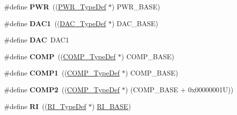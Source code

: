 \begin{DoxyCompactItemize}
\item 
\hypertarget{group___peripheral__declaration_ga04651c526497822a859942b928e57f8e}{\#define {\bfseries P\-W\-R}~((\hyperlink{struct_p_w_r___type_def}{P\-W\-R\-\_\-\-Type\-Def} $\ast$) P\-W\-R\-\_\-\-B\-A\-S\-E)}\label{group___peripheral__declaration_ga04651c526497822a859942b928e57f8e}

\item 
\hypertarget{group___peripheral__declaration_gaffb5ff8779fa698f3c7165a617d56e4f}{\#define {\bfseries D\-A\-C1}~((\hyperlink{struct_d_a_c___type_def}{D\-A\-C\-\_\-\-Type\-Def} $\ast$) D\-A\-C\-\_\-\-B\-A\-S\-E)}\label{group___peripheral__declaration_gaffb5ff8779fa698f3c7165a617d56e4f}

\item 
\hypertarget{group___peripheral__declaration_ga4aa2a4ab86ce00c23035e5cee2e7fc7e}{\#define {\bfseries D\-A\-C}~D\-A\-C1}\label{group___peripheral__declaration_ga4aa2a4ab86ce00c23035e5cee2e7fc7e}

\item 
\hypertarget{group___peripheral__declaration_ga076912543697dbe4c46b79e8e44ad2fb}{\#define {\bfseries C\-O\-M\-P}~((\hyperlink{struct_c_o_m_p___type_def}{C\-O\-M\-P\-\_\-\-Type\-Def} $\ast$) C\-O\-M\-P\-\_\-\-B\-A\-S\-E)}\label{group___peripheral__declaration_ga076912543697dbe4c46b79e8e44ad2fb}

\item 
\hypertarget{group___peripheral__declaration_gaf5713f83009027d48805b049d55bb01b}{\#define {\bfseries C\-O\-M\-P1}~((\hyperlink{struct_c_o_m_p___type_def}{C\-O\-M\-P\-\_\-\-Type\-Def} $\ast$) C\-O\-M\-P\-\_\-\-B\-A\-S\-E)}\label{group___peripheral__declaration_gaf5713f83009027d48805b049d55bb01b}

\item 
\hypertarget{group___peripheral__declaration_ga6985fa7e9bb3c2edf15b29b7af210a2b}{\#define {\bfseries C\-O\-M\-P2}~((\hyperlink{struct_c_o_m_p___type_def}{C\-O\-M\-P\-\_\-\-Type\-Def} $\ast$) (C\-O\-M\-P\-\_\-\-B\-A\-S\-E + 0x00000001\-U))}\label{group___peripheral__declaration_ga6985fa7e9bb3c2edf15b29b7af210a2b}

\item 
\hypertarget{group___peripheral__declaration_ga7e71def3baefc10ec36f1dd48da4050e}{\#define {\bfseries R\-I}~((\hyperlink{struct_r_i___type_def}{R\-I\-\_\-\-Type\-Def} $\ast$) \hyperlink{group___peripheral__memory__map_ga8fdc749e6f184b3cd9b01f179af62e4c}{R\-I\-\_\-\-B\-A\-S\-E})}\label{group___peripheral__declaration_ga7e71def3baefc10ec36f1dd48da4050e}


\end{DoxyCompactItemize}
